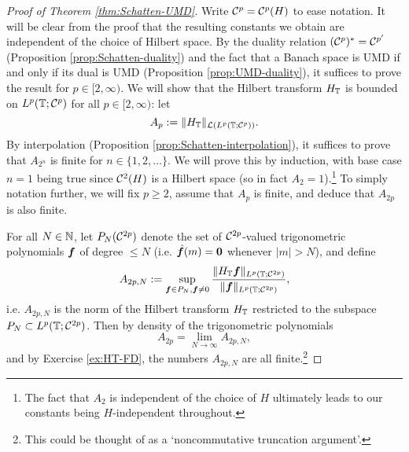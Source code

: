 \begin{proof}[Proof of Theorem \ref{thm:Schatten-UMD}]
  Write $\mathcal{C}^{p} = \mathcal{C}^{p}(H)$ to ease notation.
  It will be clear from the proof that the resulting constants we obtain are independent of the choice of Hilbert space.
  By the duality relation $(\mathcal{C}^{p})^* = \mathcal{C}^{p'}$ (Proposition \ref{prop:Schatten-duality}) and the fact that a Banach space is UMD if and only if its dual is UMD (Proposition \ref{prop:UMD-duality}), it suffices to prove the result for $p \in [2,\infty)$.
  We will show that the Hilbert transform $H_{\mathbb{T}}$ is bounded on $L^p(\mathbb{T};\mathcal{C}^{p})$ for all $p \in [2,\infty)$: let
  \begin{equation*}
    A_{p} := \|H_{\mathbb{T}}\|_{\mathcal{L}(L^p(\mathbb{T};\mathcal{C}^{p}))}.
  \end{equation*}
  By interpolation (Proposition \ref{prop:Schatten-interpolation}), it suffices to prove that $A_{2^{n}}$ is finite for $n \in \{1,2,\ldots\}$.
  We will prove this by induction, with base case $n=1$ being true since $\mathcal{C}^{2}(H)$ is a Hilbert space (so in fact $A_{2} = 1$).\footnote{The fact that $A_{2}$ is independent of the choice of $H$ ultimately leads to our constants being $H$-independent throughout.}
  To simply notation further, we will fix $p \geq 2$, assume that $A_{p}$ is finite, and deduce that $A_{2p}$ is also finite.


  For all $N \in \mathbb{N}$, let $P_{N}(\mathcal{C}^{2p})$ denote the set of $\mathcal{C}^{2p}$-valued trigonometric polynomials $\bm{f}$ of degree $\leq N$ (i.e. $\hat{\bm{f}}(m) = \bm{0}$ whenever $|m| > N$), and define
  \begin{equation*}
    A_{2p,N} := \sup_{\bm{f} \in P_{N}, \bm{f} \neq 0} \frac{\|H_{\mathbb{T}} \bm{f}\|_{L^p(\mathbb{T};\mathcal{C}^{2p})}}{\|\bm{f}\|_{L^p(\mathbb{T};\mathcal{C}^{2p})}},
  \end{equation*}
  i.e. $A_{2p,N}$ is the norm of the Hilbert transform $H_{\mathbb{T}}$ restricted to the subspace $P_{N} \subset L^p(\mathbb{T};\mathcal{C}^{2p})$.
  Then by density of the trigonometric polynomials
  \begin{equation*}
    A_{2p} = \lim_{N \to \infty} A_{2p,N},
  \end{equation*}
  and by Exercise \ref{ex:HT-FD}, the numbers $A_{2p,N}$ are all finite.\footnote{This could be thought of as a `noncommutative truncation argument'.}


\end{proof}
